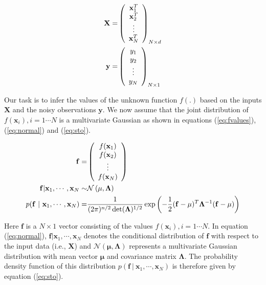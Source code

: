 \begin{align}
  \mathbf{X}  = & \left( \begin{array}{c} \mathbf{x}^{T}_1 \\ \mathbf{x}^{T}_2 \\ \vdots \\ \mathbf{x}^{T}_N \end{array} \right)_{N \times d} \label{eq:feat} \\
  \vspace{2\baselineskip}
  \mathbf{y}  = & \left( \begin{array}{c} y_1 \\ y_2 \\ \vdots \\ y_N \end{array} \right) _{N \times 1} \label{eq:labels}
\end{align}

Our task is to infer the values of the unknown function $f(.)$ based on the inputs $\mathbf{X}$ and the noisy observations $\mathbf{y}$. We now assume that the joint distribution of $f(\mathbf{x}_i), i = 1 \cdots N$ is a multivariate Gaussian as shown in equations (\ref{eq:fvalues}), (\ref{eq:normal}) and (\ref{eq:sto}).

\begin{align}
 \mathbf{f} = & \left( \begin{array}{c} f(\mathbf{x}_1) \\ f(\mathbf{x}_2) \\ \vdots \\ f(\mathbf{x}_N) \end{array} \right) \label{eq:fvalues}\\
 \vspace{2\baselineskip}
 \mathbf{f} | \mathbf{x}_1, \cdots, \mathbf{x}_N \sim & \mathcal{N}\left( \mathbf{\mu}, \mathbf{\Lambda} \right)  \label{eq:normal}\\
 \vspace{2\baselineskip}
 p( \mathbf{f} \ | \ \mathbf{x}_1, \cdots, \mathbf{x}_N) = & \frac{1}{(2\pi)^{n/2} \det(\mathbf{\Lambda})^{1/2}} \exp \left(-\frac{1}{2} (\mathbf{f} - \mathbf{\mu})^T \mathbf{\Lambda}^{-1} (\mathbf{f} - \mathbf{\mu}) \right) \label{eq:sto}
\end{align}

Here $\mathbf{f}$ is a $N\times 1$ vector consisting of the values $f(\mathbf{x}_i), i = 1 \cdots N$. In equation (\ref{eq:normal}), $\mathbf{f}|\mathbf{x}_1, \cdots, \mathbf{x}_N$ denotes the conditional distribution of $\mathbf{f}$ with respect to the input data (i.e., $\mathbf{X}$) and $\mathcal{N}\left( \mathbf{\mu}, \mathbf{\Lambda} \right)$ represents a multivariate Gaussian distribution with mean vector $\mathbf{\mu}$ and covariance matrix $\mathbf{\Lambda}$. The probability density function of this distribution $p( \mathbf{f} \ | \ \mathbf{x}_1, \cdots, \mathbf{x}_N)$ is therefore given by equation (\ref{eq:sto}).

